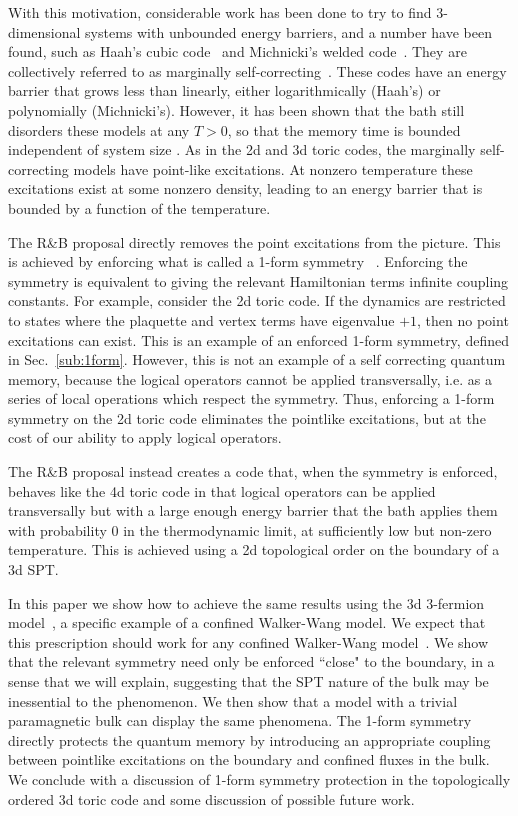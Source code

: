 With this motivation, considerable work has been done to try to find 3-dimensional systems with unbounded energy barriers, and a number have been found, such as Haah's cubic code~\cite{Haah2011Code} and Michnicki's welded code~\cite{Michnicki2014PowerLaw}. They are collectively referred to as marginally self-correcting~\cite{Siva2017Marginally}. These codes have an energy barrier that grows less than linearly, either logarithmically (Haah's) or polynomially (Michnicki's). However, it has been shown that the bath still disorders these models at any $T>0$, so that the memory time is bounded independent of system size \cite{Siva2017Marginally, PremHaahNandkishore2017}. As in the 2d and 3d toric codes, the marginally self-correcting models have point-like excitations. At nonzero temperature these excitations exist at some nonzero density, leading to an energy barrier that is bounded by a function of the temperature.

The R\&B proposal directly removes the point excitations from the picture. This is achieved by enforcing what is called a 1-form symmetry ~\cite{Gaiotto2015Generalized, Lake2018Higher}.  Enforcing the symmetry is equivalent to giving the relevant Hamiltonian terms infinite coupling constants.
For example, consider the 2d toric code. If the dynamics are restricted to states where the plaquette and vertex terms have eigenvalue $+1$, then no point excitations can exist. This is an example of an enforced 1-form symmetry, defined in Sec.~\ref{sub:1form}. However, this is not an example of a self correcting quantum memory, because the logical operators cannot be applied transversally, i.e. as a series of local operations which respect the symmetry. Thus, enforcing a 1-form symmetry on the 2d toric code eliminates the pointlike excitations, but at the cost of our ability to apply logical operators. 

The R\&B proposal \cite{RobertsBartlett2020} instead creates a code that, when the symmetry is enforced, behaves like the 4d toric code in that logical operators can be applied transversally but with a large enough energy barrier that the bath applies them with probability 0 in the thermodynamic limit, at sufficiently low but non-zero temperature. This is achieved using a 2d topological order on the boundary of a 3d SPT. 
	
In this paper we show how to achieve the same results using the 3d 3-fermion model~\cite{Burnell2014Soluble}, a specific example of a confined Walker-Wang model. We expect that this prescription should work for any confined Walker-Wang model~\cite{WalkerWang2011, vonKeyserlingk2013SurfaceAnyons}. We show that the relevant symmetry need only be enforced ``close" to the boundary, in a sense that we will explain, suggesting that the SPT nature of the bulk may be inessential to the phenomenon. 
We then show that a model with a trivial paramagnetic bulk can display the same phenomena. The 1-form symmetry directly protects the quantum memory by introducing an appropriate coupling between pointlike excitations on the boundary and confined fluxes in the bulk. 
We conclude with a discussion of 1-form symmetry protection in the topologically ordered 3d toric code and some discussion of possible future work.

